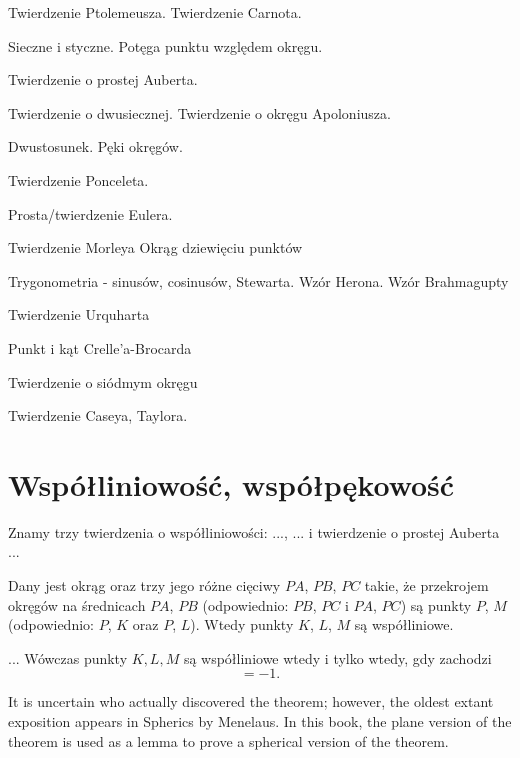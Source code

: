 \documentclass{parchment}
\begin{document}
Twierdzenie Ptolemeusza.
Twierdzenie Carnota.

Sieczne i styczne.
Potęga punktu względem okręgu.

Twierdzenie o prostej Auberta.

Twierdzenie o dwusiecznej.
Twierdzenie o okręgu Apoloniusza.

Dwustosunek.
Pęki okręgów.

Twierdzenie Ponceleta.

Prosta/twierdzenie Eulera.

Twierdzenie Morleya
Okrąg dziewięciu punktów

Trygonometria - sinusów, cosinusów, Stewarta.
Wzór Herona.
Wzór Brahmagupty

Twierdzenie Urquharta

Punkt i kąt Crelle'a-Brocarda

Twierdzenie o siódmym okręgu

Twierdzenie Caseya, Taylora.

\chapter{Współliniowość, współpękowość}

Znamy trzy twierdzenia o współliniowości: ..., ... i twierdzenie o prostej Auberta ...

\begin{proposition}
	Dany jest okrąg oraz trzy jego różne cięciwy $PA$, $PB$, $PC$ takie, że przekrojem okręgów na średnicach $PA$, $PB$ (odpowiednio: $PB$, $PC$ i $PA$, $PC$) są punkty $P$, $M$ (odpowiednio: $P$, $K$ oraz $P$, $L$).
	Wtedy punkty $K$, $L$, $M$ są współliniowe.
\end{proposition}

\begin{proposition}
	...
	Wówczas punkty $K, L, M$ są współliniowe wtedy i tylko wtedy, gdy zachodzi
	\begin{equation}
		[AMB] [BKC] [CLA] = -1.
	\end{equation}
\end{proposition}

It is uncertain who actually discovered the theorem; however, the oldest extant exposition appears in Spherics by Menelaus. In this book, the plane version of the theorem is used as a lemma to prove a spherical version of the theorem.
\end{document}
